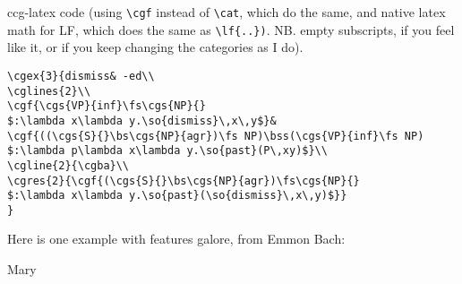 \documentclass[11pt]{article}
\begin{document}
ccg-latex code (using \verb|\cgf| instead of \verb|\cat|, which do the same, and native latex math for LF, which does the  same as \verb|\lf{..})|. NB. empty subscripts, if you feel like it, or if you keep changing the categories as I do).

\begin{verbatim}
\cgex{3}{dismiss& -ed\\
\cglines{2}\\
\cgf{\cgs{VP}{inf}\fs\cgs{NP}{}
$:\lambda x\lambda y.\so{dismiss}\,x\,y$}&
\cgf{((\cgs{S}{}\bs\cgs{NP}{agr})\fs NP)\bss(\cgs{VP}{inf}\fs NP)
$:\lambda p\lambda x\lambda y.\so{past}(P\,xy)$}\\
\cgline{2}{\cgba}\\
\cgres{2}{\cgf{(\cgs{S}{}\bs\cgs{NP}{agr})\fs\cgs{NP}{}
$:\lambda x\lambda y.\so{past}(\so{dismiss}\,x\,y)$}}
}
\end{verbatim}
\newpage

Here is one example with features galore, from Emmon Bach:\bigskip

{\footnotesize
Mary }\bigskip
\end{document}
